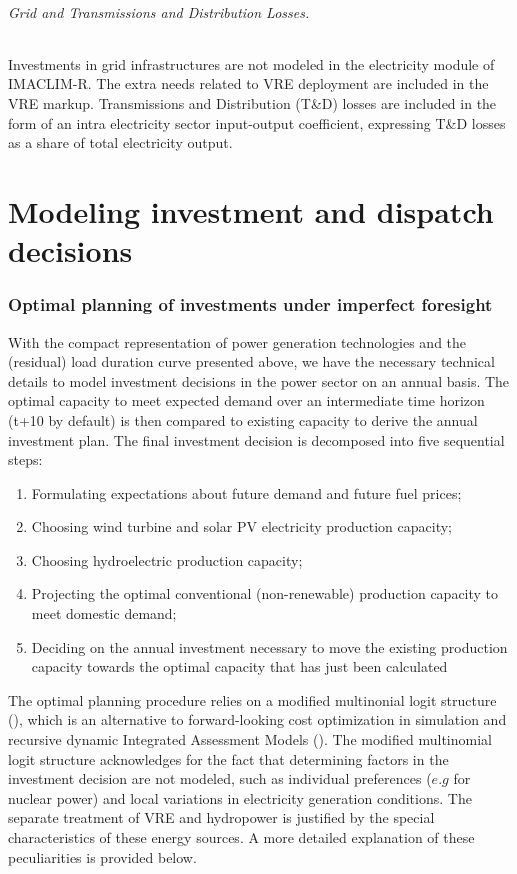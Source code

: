 \paragraph*{Grid and Transmissions and Distribution Losses.}

Investments in grid infrastructures are not modeled in the electricity module of IMACLIM-R. The extra needs related to VRE deployment are included in the VRE markup. Transmissions and Distribution (T\&D) losses are included in the form of an intra electricity sector input-output coefficient, expressing T\&D losses as a share of total electricity output.
\part*{Modeling investment and dispatch decisions}

\section{Optimal planning of investments under imperfect foresight}

With the compact representation of power generation technologies and the (residual) load duration curve presented above, we have the necessary technical details to model investment decisions in the power sector on an annual basis.
The optimal capacity to meet expected demand over an intermediate time horizon (t+10 by default) is then compared to existing capacity to derive the annual investment plan.
The final investment decision is decomposed into five sequential steps:
\begin{enumerate}
    \item Formulating expectations about future demand and future fuel prices;
    \item Choosing  wind turbine and solar PV  electricity production capacity;
    \item Choosing hydroelectric production capacity;
    \item Projecting the optimal conventional (non-renewable) production capacity to meet domestic demand;
    \item Deciding on the annual investment necessary to move the existing production capacity towards the optimal capacity that has just been calculated
\end{enumerate}

The optimal planning procedure relies on a modified multinonial logit structure (\cite{Clarke1993}), which is an alternative to forward-looking cost optimization in simulation and recursive dynamic Integrated Assessment Models (\cite{GCAM}). The modified multinomial logit structure acknowledges for the fact that determining factors in the investment decision are not modeled, such as individual preferences ($e.g$ for nuclear power) and local variations in electricity generation conditions.
The separate treatment of VRE and hydropower is justified by the special characteristics of these energy sources. A more detailed explanation of these peculiarities is provided below.

